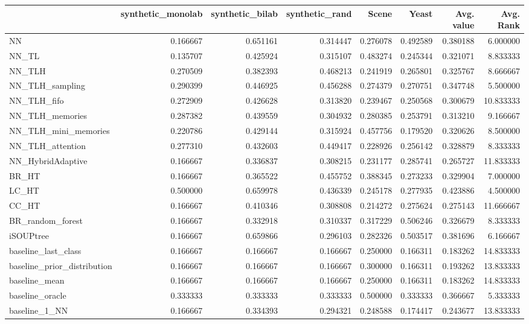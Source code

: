 \begin{tabular}{lrrrrrrr}
\toprule
 & synthetic_monolab & synthetic_bilab & synthetic_rand & Scene & Yeast & Avg. value & Avg. Rank \\
\midrule
NN & 0.166667 & 0.651161 & 0.314447 & 0.276078 & 0.492589 & 0.380188 & 6.000000 \\
NN_TL & 0.135707 & 0.425924 & 0.315107 & 0.483274 & 0.245344 & 0.321071 & 8.833333 \\
NN_TLH & 0.270509 & 0.382393 & 0.468213 & 0.241919 & 0.265801 & 0.325767 & 8.666667 \\
NN_TLH_sampling & 0.290399 & 0.446925 & 0.456288 & 0.274379 & 0.270751 & 0.347748 & 5.500000 \\
NN_TLH_fifo & 0.272909 & 0.426628 & 0.313820 & 0.239467 & 0.250568 & 0.300679 & 10.833333 \\
NN_TLH_memories & 0.287382 & 0.439559 & 0.304932 & 0.280385 & 0.253791 & 0.313210 & 9.166667 \\
NN_TLH_mini_memories & 0.220786 & 0.429144 & 0.315924 & 0.457756 & 0.179520 & 0.320626 & 8.500000 \\
NN_TLH_attention & 0.277310 & 0.432603 & 0.449417 & 0.228926 & 0.256142 & 0.328879 & 8.333333 \\
NN_HybridAdaptive & 0.166667 & 0.336837 & 0.308215 & 0.231177 & 0.285741 & 0.265727 & 11.833333 \\
BR_HT & 0.166667 & 0.365522 & 0.455752 & 0.388345 & 0.273233 & 0.329904 & 7.000000 \\
LC_HT & 0.500000 & 0.659978 & 0.436339 & 0.245178 & 0.277935 & 0.423886 & 4.500000 \\
CC_HT & 0.166667 & 0.410346 & 0.308808 & 0.214272 & 0.275624 & 0.275143 & 11.666667 \\
BR_random_forest & 0.166667 & 0.332918 & 0.310337 & 0.317229 & 0.506246 & 0.326679 & 8.333333 \\
iSOUPtree & 0.166667 & 0.659866 & 0.296103 & 0.282326 & 0.503517 & 0.381696 & 6.166667 \\
baseline_last_class & 0.166667 & 0.166667 & 0.166667 & 0.250000 & 0.166311 & 0.183262 & 14.833333 \\
baseline_prior_distribution & 0.166667 & 0.166667 & 0.166667 & 0.300000 & 0.166311 & 0.193262 & 13.833333 \\
baseline_mean & 0.166667 & 0.166667 & 0.166667 & 0.250000 & 0.166311 & 0.183262 & 14.833333 \\
baseline_oracle & 0.333333 & 0.333333 & 0.333333 & 0.500000 & 0.333333 & 0.366667 & 5.333333 \\
baseline_1_NN & 0.166667 & 0.334393 & 0.294321 & 0.248588 & 0.174417 & 0.243677 & 13.833333 \\
\bottomrule
\end{tabular}

